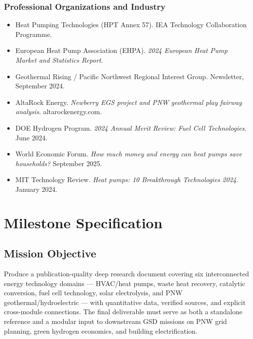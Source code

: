 \documentclass[11pt,letterpaper]{article}
\newcommand{\stageheader}[2]{%
  \noindent\colorbox{#2}{\makebox[\textwidth][l]{%
    \textcolor{white}{\bfseries\sffamily\hspace{6pt}#1\hspace{6pt}}}}%
  \vspace{0.5em}\par%
}
\begin{document}
\subsubsection{Professional Organizations and Industry}
\begin{itemize}
  \item Heat Pumping Technologies (HPT Annex 57). IEA Technology Collaboration Programme.
  \item European Heat Pump Association (EHPA). \textit{2024 European Heat Pump Market and Statistics Report}.
  \item Geothermal Rising / Pacific Northwest Regional Interest Group. Newsletter, September 2024.
  \item AltaRock Energy. \textit{Newberry EGS project and PNW geothermal play fairway analysis}. altarockenergy.com.
  \item DOE Hydrogen Program. \textit{2024 Annual Merit Review: Fuel Cell Technologies}. June 2024.
  \item World Economic Forum. \textit{How much money and energy can heat pumps save households?} September 2025.
  \item MIT Technology Review. \textit{Heat pumps: 10 Breakthrough Technologies 2024}. January 2024.
\end{itemize}

\newpage

\stageheader{STAGE 3 --- MISSION PACKAGE}{tertiary}

\section{Milestone Specification}

\subsection{Mission Objective}

Produce a publication-quality deep research document covering six interconnected energy technology domains — HVAC/heat pumps, waste heat recovery, catalytic conversion, fuel cell technology, solar electrolysis, and PNW geothermal/hydroelectric — with quantitative data, verified sources, and explicit cross-module connections. The final deliverable must serve as both a standalone reference and a modular input to downstream GSD missions on PNW grid planning, green hydrogen economics, and building electrification.
\end{document}
